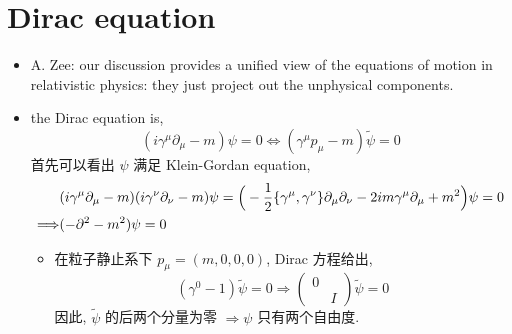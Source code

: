 \section{Dirac equation}
\begin{itemize}
	\item A. Zee: our discussion provides a unified view of the equations of motion in relativistic physics: they just project out the unphysical components.
	
	\item the Dirac equation is,
	\begin{equation}
		(i \gamma^\mu \partial_\mu - m) \psi = 0 \iff (\gamma^\mu p_\mu - m) \tilde{\psi} = 0
	\end{equation}
	首先可以看出 $\psi$ 满足 Klein-Gordan equation,
	\begin{align}
		& (i \gamma^\mu \partial_\mu - m) (i \gamma^\nu \partial_\nu - m) \psi = \Big( - \frac{1}{2} \{\gamma^\mu, \gamma^\nu\} \partial_\mu \partial_\nu - 2 i m \gamma^\mu \partial_\mu + m^2 \Big) \psi = 0 \notag \\
		\Longrightarrow & (- \partial^2 - m^2) \psi = 0
	\end{align}
	\begin{itemize}
		\item 在粒子静止系下 $p_\mu = (m, 0, 0, 0)$, Dirac 方程给出,
		\begin{equation}
			(\gamma^0 - 1) \tilde{\psi} = 0 \Longrightarrow \begin{pmatrix}
				0 & \\
				& I
			\end{pmatrix} \tilde{\psi} = 0
		\end{equation}
		因此, $\tilde{\psi}$ 的后两个分量为零 $\Longrightarrow \psi$ 只有两个自由度.
	\end{itemize}
\end{itemize}
